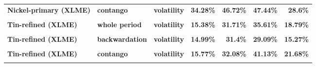 \documentclass[
  authoryear,
  preprint,
  3p]{elsarticle}
\begin{document}
\begin{longtable}[t]{>{}l>{}l>{}l>{}r>{}r>{}r>{}r}
\textbf{Nickel-primary (XLME)} & \textbf{contango} & \textbf{volatility} & \textcolor[HTML]{4285f4}{\textbf{34.28\%}} & \textcolor[HTML]{4285f4}{\textbf{46.72\%}} & \textcolor[HTML]{4285f4}{\textbf{47.44\%}} & \textcolor[HTML]{4285f4}{\textbf{28.6\%}}\\
\textbf{\cellcolor{gray!10}{Tin-refined (XLME)}} & \textbf{\cellcolor{gray!10}{whole period}} & \textbf{\cellcolor{gray!10}{mean}} & \textcolor[HTML]{4285f4}{\textbf{\cellcolor{gray!10}{4.07\%}}} & \textcolor[HTML]{4285f4}{\textbf{\cellcolor{gray!10}{*29.1\%}}} & \textcolor[HTML]{4285f4}{\textbf{\cellcolor{gray!10}{7.46\%}}} & \textcolor[HTML]{4285f4}{\textbf{\cellcolor{gray!10}{1.68\%}}}\\
\textbf{Tin-refined (XLME)} & \textbf{whole period} & \textbf{volatility} & \textcolor[HTML]{4285f4}{\textbf{15.38\%}} & \textcolor[HTML]{4285f4}{\textbf{31.71\%}} & \textcolor[HTML]{4285f4}{\textbf{35.61\%}} & \textcolor[HTML]{4285f4}{\textbf{18.79\%}}\\
\addlinespace
\textbf{\cellcolor{gray!10}{Tin-refined (XLME)}} & \textbf{\cellcolor{gray!10}{backwardation}} & \textbf{\cellcolor{gray!10}{mean}} & \textcolor[HTML]{4285f4}{\textbf{\cellcolor{gray!10}{*15.83\%}}} & \textcolor[HTML]{4285f4}{\textbf{\cellcolor{gray!10}{34.62\%}}} & \textcolor[HTML]{4285f4}{\textbf{\cellcolor{gray!10}{23.7\%}}} & \textcolor[HTML]{4285f4}{\textbf{\cellcolor{gray!10}{4.48\%}}}\\
\textbf{Tin-refined (XLME)} & \textbf{backwardation} & \textbf{volatility} & \textcolor[HTML]{4285f4}{\textbf{14.99\%}} & \textcolor[HTML]{4285f4}{\textbf{31.4\%}} & \textcolor[HTML]{4285f4}{\textbf{29.09\%}} & \textcolor[HTML]{4285f4}{\textbf{15.27\%}}\\
\textbf{\cellcolor{gray!10}{Tin-refined (XLME)}} & \textbf{\cellcolor{gray!10}{contango}} & \textbf{\cellcolor{gray!10}{mean}} & \textcolor[HTML]{4285f4}{\textbf{\cellcolor{gray!10}{-7.78\%}}} & \textcolor[HTML]{4285f4}{\textbf{\cellcolor{gray!10}{23.88\%}}} & \textcolor[HTML]{4285f4}{\textbf{\cellcolor{gray!10}{-6.82\%}}} & \textcolor[HTML]{4285f4}{\textbf{\cellcolor{gray!10}{-1.69\%}}}\\
\textbf{Tin-refined (XLME)} & \textbf{contango} & \textbf{volatility} & \textcolor[HTML]{4285f4}{\textbf{15.77\%}} & \textcolor[HTML]{4285f4}{\textbf{32.08\%}} & \textcolor[HTML]{4285f4}{\textbf{41.13\%}} & \textcolor[HTML]{4285f4}{\textbf{21.68\%}}\\
\textbf{\cellcolor{gray!10}{Zinc (XLME)}} & \textbf{\cellcolor{gray!10}{whole period}} & \textbf{\cellcolor{gray!10}{mean}} & \textcolor[HTML]{4285f4}{\textbf{\cellcolor{gray!10}{-4.52\%}}} & \textcolor[HTML]{4285f4}{\textbf{\cellcolor{gray!10}{20.13\%}}} & \textcolor[HTML]{4285f4}{\textbf{\cellcolor{gray!10}{7.62\%}}} & \textcolor[HTML]{4285f4}{\textbf{\cellcolor{gray!10}{9.07\%}}}\\

\end{longtable}
\end{document}
